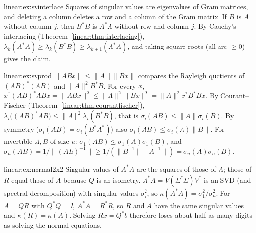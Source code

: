 \begin{solution}{linear:ex:svinterlace}
\idea Squares of singular values are eigenvalues of Gram matrices, and deleting a column deletes a row and a column of
the Gram matrix.
\writeup If $B$ is $A$ without column $j$, then $B^*B$ is $A^*A$ without row and column $j$. By Cauchy's interlacing
(Theorem~\ref{linear:thm:interlacing}), $\lambda_k(A^*A)\ge\lambda_k(B^*B)\ge\lambda_{k+1}(A^*A)$, and taking square roots (all are
$\ge0$) gives the claim.
\end{solution}

\begin{solution}{linear:ex:svprod}
\idea $\|ABx\|\le\|A\|\|Bx\|$ compares the Rayleigh quotients of $(AB)^*(AB)$ and $\|A\|^2B^*B$.
\writeup For every $x$, $x^*(AB)^*ABx=\|ABx\|^2\le\|A\|^2\|Bx\|^2=\|A\|^2x^*B^*Bx$. By Courant--Fischer
(Theorem~\ref{linear:thm:courantfischer}), $\lambda_i\bigl((AB)^*AB\bigr)\le\|A\|^2\lambda_i(B^*B)$, that is $\sigma_i(AB)\le\|A\|\sigma_i(B)$.
By symmetry ($\sigma_i(AB)=\sigma_i(B^*A^*)$) also $\sigma_i(AB)\le\sigma_i(A)\|B\|$. For invertible $A,B$ of size $n$:
$\sigma_1(AB)\le\sigma_1(A)\sigma_1(B)$, and $\sigma_n(AB)=1/\|(AB)^{-1}\|\ge1/(\|B^{-1}\|\|A^{-1}\|)=\sigma_n(A)\sigma_n(B)$.
\end{solution}

\begin{solution}{linear:ex:normal2x2}
\idea Singular values of $A^*A$ are the squares of those of $A$; those of $R$ equal those of $A$ because $Q$ is an isometry.
\writeup $A^*A=V(\Sigma^*\Sigma)V^*$ is an SVD (and spectral decomposition) with singular values $\sigma_i^2$, so $\kappa(A^*A)=
\sigma_1^2/\sigma_n^2$. For $A=QR$ with $Q^*Q=I$, $A^*A=R^*R$, so $R$ and $A$ have the same singular values and $\kappa(R)=
\kappa(A)$. Solving $Rx=Q^*b$ therefore loses about half as many digits as solving the normal equations.
\end{solution}

